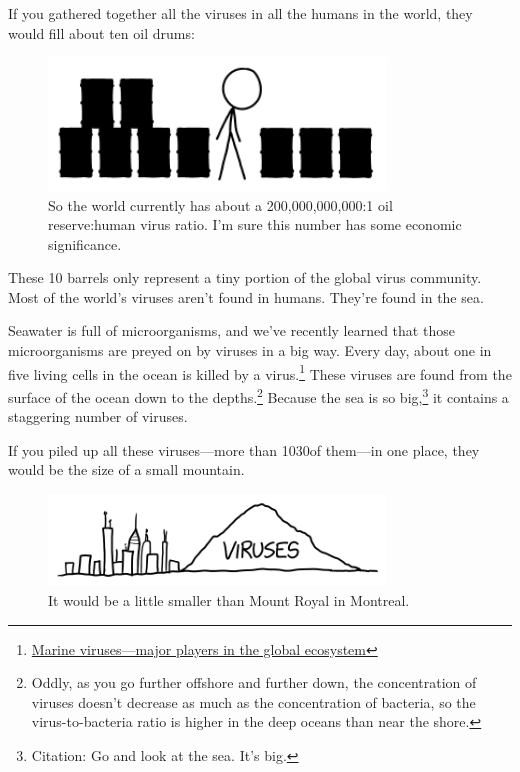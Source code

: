{{If you gathered together all the viruses in all the humans in the world, they would fill about ten oil drums:}

\begin{figure}[!htbp]
\centering
\includegraphics[scale=0.5, max width=0.8\textwidth]{imgs/a/80/virus_oil.png}
\caption{So the world currently has about a 200,000,000,000:1 oil reserve:human virus ratio. I'm sure this number has some economic significance.}
\end{figure}

{These 10 barrels only represent a tiny portion of the global virus community. Most of the world's viruses aren't found in humans. They're found in the sea.}

{Seawater is full of microorganisms, and we've recently learned that those microorganisms are preyed on by viruses in a big way. Every day, about one in five living cells in the ocean is killed by a virus.{\footnote{ \href{https://www.uni-due.de/imperia/md/content/water-science/ws0910/2031b\_02z\_ws0910\_suttle\_marine\_viruses.pdf}{Marine viruses—major players in the global ecosystem}} } These viruses are found from the surface of the ocean down to the depths.{\footnote{Oddly, as you go further offshore and further down, the concentration of viruses doesn't decrease as much as the concentration of bacteria, so the virus-to-bacteria ratio is higher in the deep oceans than near the shore.} } Because the sea is so big,{\footnote{Citation: Go and look at the sea. It's big.} } it contains a staggering number of viruses.}

{If you piled up all these viruses—more than 1030of them—in one place, they would be the size of a small mountain.}

\begin{figure}[!htbp]
\centering
\includegraphics[scale=0.5, max width=0.8\textwidth]{imgs/a/80/virus_mountain.png}
\caption{It would be a little smaller than Mount Royal in Montreal.}
\end{figure}

}

